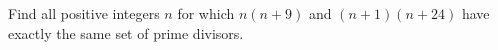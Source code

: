 Find all positive integers $n$ for which $n(n+9)$ and $(n+1)(n+24)$ have exactly the same set of prime divisors.
